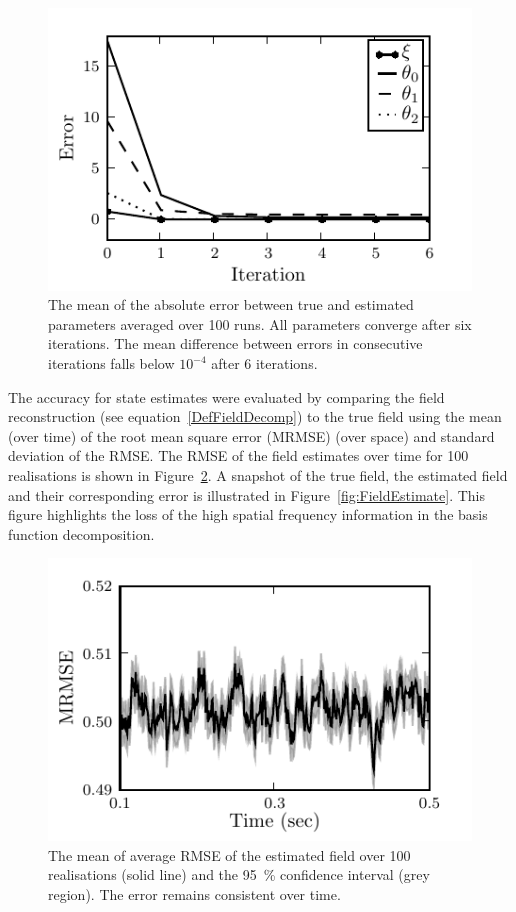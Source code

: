 \documentclass[10pt,a4paper]{article}
\begin{document}
\begin{figure}
        \centering
\includegraphics{./Graph/convergence.pdf}
\caption{The mean of the absolute error between true and estimated parameters averaged over 100 runs. All parameters converge after six iterations. The mean difference between errors in consecutive iterations falls below $10^{-4}$ after 6 iterations. }
\label{fig:ParametersConvergence}
\end{figure}

The accuracy for state estimates were evaluated by comparing the field reconstruction (see equation~\ref{DefFieldDecomp}) to the true field using the mean (over time) of the root mean square error (MRMSE) (over space) and standard deviation of the RMSE. The RMSE of the field estimates over time for 100 realisations is shown in Figure~\ref{fig:RMSE}. A snapshot of the true field, the estimated field and their corresponding error is illustrated in Figure~\ref{fig:FieldEstimate}. This figure highlights the loss of the high spatial frequency information in the basis function decomposition.
  \begin{figure}
   	\begin{center}
   		\includegraphics{./Graph/MRMSE.pdf} 
   	\end{center}
   	\caption{The mean of average RMSE of the estimated field over 100 realisations (solid line) and the 95~\% confidence interval (grey region). The error remains consistent over time.} 
\label{fig:RMSE}
   \end{figure}
  
\end{document}
